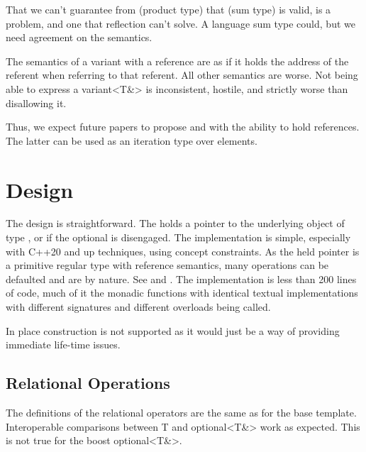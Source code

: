 \documentclass[a4paper,10pt,oneside,openany,final,article]{memoir}
\begin{document}
That we can't guarantee from  (product type) that  (sum type) is valid, is a problem, and one that reflection can't solve. A language sum type could, but we need agreement on the semantics.

The semantics of a variant with a reference are as if it holds the address of the referent when referring to that referent. All other semantics are worse. Not being able to express a variant<T\&> is inconsistent, hostile, and strictly worse than disallowing it.

Thus, we expect future papers to propose  and  with the ability to hold references.
The latter can be used as an iteration type over  elements.


\chapter{Design}

The design is straightforward. The  holds a pointer to the underlying object of type , or  if the optional is disengaged. The implementation is simple, especially with C++20 and up techniques, using concept constraints. As the held pointer is a primitive regular type with reference semantics, many operations can be defaulted and are  by nature. See \cite{Downey_smd_optional_optional_T} and \cite{rawgithu58:online}. The  implementation is less than 200 lines of code, much of it the monadic functions with identical textual implementations with different signatures and different overloads being called.

In place construction is not supported as it would just be a way of providing immediate life-time issues.

\section{Relational Operations}

The definitions of the relational operators are the same as for the base template. Interoperable comparisons between T and optional<T\&> work as expected. This is not true for the boost optional<T\&>.
\end{document}

